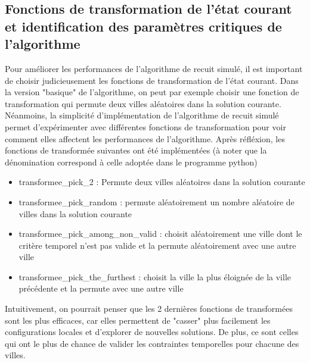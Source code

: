 \documentclass[a4paper, 12pt]{article}
\begin{document}
\subsection{Fonctions de transformation de l'état courant et identification des paramètres critiques de l'algorithme}
Pour améliorer les performances de l'algorithme de recuit simulé, il est important de choisir judicieusement les fonctions de transformation de l'état courant.
Dans la version "basique" de l'algorithme, on peut par exemple choisir une fonction de transformation qui permute deux villes aléatoires dans la solution courante.
Néanmoins, la simplicité d'implémentation de l'algorithme de recuit simulé permet d'expérimenter avec différentes fonctions de transformation pour voir comment elles affectent les performances de l'algorithme. 
Après réfléxion, les fonctions de transformée suivantes ont été implémentées (à noter que la dénomination correspond à celle adoptée dans le programme python)
\begin{itemize}
    \item transformee\_pick\_2 : Permute deux villes aléatoires dans la solution courante
    \item transformee\_pick\_random : permute aléatoirement un nombre aléatoire de villes dans la solution courante
    \item transformee\_pick\_among\_non\_valid : choisit aléatoirement une ville dont le critère temporel n'est pas valide et la permute aléatoirement avec une autre ville
    \item transformee\_pick\_the\_furthest : choisit la ville la plus éloignée de la ville précédente et la permute avec une autre ville
\end{itemize}

\vspace{0.5cm}
Intuitivement, on pourrait penser que les 2 dernières fonctions de transformées sont les plus efficaces, car elles permettent de "casser" plus facilement les configurations locales et d'explorer de nouvelles solutions. De plus, ce sont celles qui ont le plus de chance de valider les contraintes temporelles pour chacune des villes.
\end{document}
